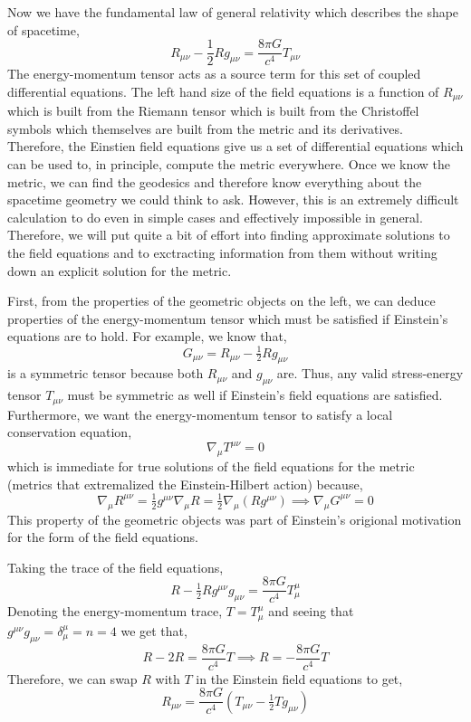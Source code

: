 \documentclass[11pt, a4paper]{article}
\begin{document}
Now we have the fundamental law of general relativity which describes the shape of spacetime,
\[ R_{\mu \nu}  - \frac{1}{2} R g_{\mu \nu} = \frac{8\pi G}{c^4} T_{\mu \nu}\] 
The energy-momentum tensor acts as a source term for this set of coupled differential equations. The left hand size of the field equations is a function of $R_{\mu \nu}$ which is built from the Riemann tensor which is built from the Christoffel symbols which themselves are built from the metric and its derivatives. Therefore, the Einstien field equations give us a set of differential equations which can be used to, in principle, compute the metric everywhere. Once we know the metric, we can find the geodesics and therefore know everything about the spacetime geometry we could think to ask. However, this is an extremely difficult calculation to do even in simple cases and effectively impossible in general. Therefore, we will put quite a bit of effort into finding approximate solutions to the field equations and to exctracting information from them without writing down an explicit solution for the metric. 
\par
First, from the properties of the geometric objects on the left, we can deduce properties of the energy-momentum tensor which must be satisfied if Einstein's equations are to hold. For example, we know that,
\[G_{\mu \nu} = R_{\mu \nu} - \tfrac{1}{2} R g_{\mu \nu} \]
is a symmetric tensor because both $R_{\mu \nu}$ and $g_{\mu \nu}$ are. Thus, any valid stress-energy tensor $T_{\mu \nu}$ must be symmetric as well if Einstein's field equations are satisfied. Furthermore, we want the energy-momentum tensor to satisfy a local conservation equation,
\[ \nabla_{\mu} T^{\mu \nu} = 0 \]
which is immediate for true solutions of the field equations for the metric (metrics that extremalized the Einstein-Hilbert action) because,
\[ \nabla_\mu R^{\mu \nu} = \tfrac{1}{2} g^{\mu \nu} \nabla_\mu R = \tfrac{1}{2} \nabla_\mu (R g^{\mu \nu}) \implies \nabla_\mu G^{\mu \nu} = 0\]
This property of the geometric objects was part of Einstein's origional motivation for the form of the field equations. 
\par 
Taking the trace of the field equations,
\[ R - \tfrac{1}{2} R g^{\mu \nu} g_{\mu \nu} = \frac{8 \pi G}{c^4} T^{\mu}_{\mu} \]
Denoting the energy-momentum trace, $T = T^{\mu}_{\mu}$ and seeing that $g^{\mu \nu} g_{\mu \nu} = \delta^\mu_{\mu} = n = 4$ we get that,
\[ R - 2 R = \frac{8 \pi G}{c^4} T \implies R = - \frac{8 \pi G}{c^4} T \]
Therefore, we can swap $R$ with $T$ in the Einstein field equations to get,
\[ R_{\mu \nu} = \frac{8 \pi G}{c^4} (T_{\mu \nu} - \tfrac{1}{2} T g_{\mu \nu}) \]
\end{document}
